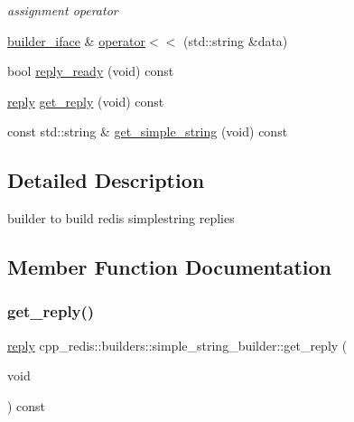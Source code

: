 \begin{DoxyCompactItemize}
\begin{DoxyCompactList}\small\item\em assignment operator \end{DoxyCompactList}\item 
\mbox{\hyperlink{classcpp__redis_1_1builders_1_1builder__iface}{builder\+\_\+iface}} \& \mbox{\hyperlink{classcpp__redis_1_1builders_1_1simple__string__builder_a159bb512f0427c4a988742f7cd01035e}{operator$<$$<$}} (std\+::string \&data)
\item 
bool \mbox{\hyperlink{classcpp__redis_1_1builders_1_1simple__string__builder_ad586164caf02b3022b91789cac23a72d}{reply\+\_\+ready}} (void) const
\item 
\mbox{\hyperlink{classcpp__redis_1_1reply}{reply}} \mbox{\hyperlink{classcpp__redis_1_1builders_1_1simple__string__builder_a24ad0968d7d02172a65cf8982c540d51}{get\+\_\+reply}} (void) const
\item 
const std\+::string \& \mbox{\hyperlink{classcpp__redis_1_1builders_1_1simple__string__builder_a539ba8a9234269e57471f1973adc58c2}{get\+\_\+simple\+\_\+string}} (void) const
\end{DoxyCompactItemize}


\subsection{Detailed Description}
builder to build redis simplestring replies 

\subsection{Member Function Documentation}
\mbox{\label{classcpp__redis_1_1builders_1_1simple__string__builder_a24ad0968d7d02172a65cf8982c540d51}} 
\subsubsection{\texorpdfstring{get\+\_\+reply()}{get\_reply()}}
{\footnotesize\ttfamily \mbox{\hyperlink{classcpp__redis_1_1reply}{reply}} cpp\+\_\+redis\+::builders\+::simple\+\_\+string\+\_\+builder\+::get\+\_\+reply (\begin{DoxyParamCaption}\item[{void}]{ }\end{DoxyParamCaption}) const\hspace{0.3cm}{\ttfamily [virtual]}}

